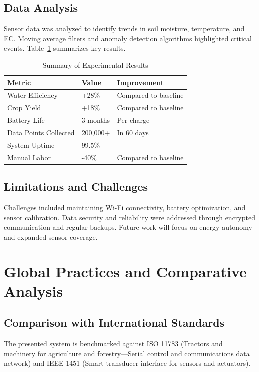 \documentclass[12pt,a4paper]{article}
\begin{document}
\subsection{Data Analysis}
Sensor data was analyzed to identify trends in soil moisture, temperature, and EC. Moving average filters and anomaly detection algorithms highlighted critical events. Table~\ref{tab:results} summarizes key results.

\begin{table}[H]
    \centering
    \caption{Summary of Experimental Results}
    \begin{tabular}{@{}lll@{}}
    \toprule
    Metric & Value & Improvement \\
    \midrule
    Water Efficiency & +28\% & Compared to baseline \\
    Crop Yield & +18\% & Compared to baseline \\
    Battery Life & 3 months & Per charge \\
    Data Points Collected & 200,000+ & In 60 days \\
    System Uptime & 99.5\% & \\
    Manual Labor & -40\% & Compared to baseline \\
    \bottomrule
    \end{tabular}\label{tab:results}
\end{table}

\subsection{Limitations and Challenges}
Challenges included maintaining Wi-Fi connectivity, battery optimization, and sensor calibration. Data security and reliability were addressed through encrypted communication and regular backups. Future work will focus on energy autonomy and expanded sensor coverage.

\section{Global Practices and Comparative Analysis}
\subsection{Comparison with International Standards}
The presented system is benchmarked against ISO 11783 (Tractors and machinery for agriculture and forestry—Serial control and communications data network) and IEEE 1451 (Smart transducer interface for sensors and actuators).
\end{document}
